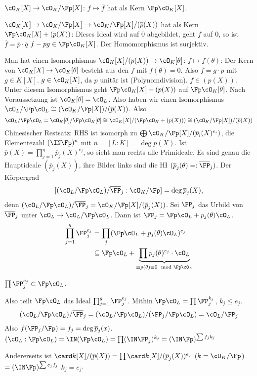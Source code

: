 \begin{Beweis}
 $\cO_K[X]\rightarrow\cO_K/\Fp[X]$: $f\mapsto \overline{f}$ hat als Kern $\Fp\cO_K[X]$.
 
 $\cO_K[X]\rightarrow\cO_K/\Fp[X]\rightarrow \cO_K/\Fp[X]/(\overline{p}(X))$ hat als Kern $\Fp\cO_K[X]+(p(X))$: Dieses Ideal wird auf $0$ abgebildet, geht $f$ auf $0$, so ist $\overline{f}=\overline{p}\cdot\overline{q}$ \folge $f-pg\in\Fp\cO_K[X]$. Der Homomorphismus ist surjektiv.
 
 Man hat einen Isomorphismus $\cO_K[X]/(p(X))\rightarrow \cO_K[\theta]$: $f\mapsto f(\theta)$: Der Kern von $\cO_K[X]\rightarrow\cO_K[\theta]$ besteht aus den $f$ mit $f(\theta)=0$. Also $f=g\cdot p$ mit $g\in K[X]$. \folge $g\in\cO_K[X]$, da $p$ unitär ist (Polynomdivision). \folge $f\in (p(X))$. Unter diesem Isomorphismus geht $\Fp\cO_K[X]+(p(X))$ auf $\Fp\cO_K[\theta]$. Nach Voraussetzung ist $\cO_K[\theta]=\cO_L$. Also haben wir einen Isomorphismus $\cO_L/\Fp\cO_L \cong (\cO_K/\Fp[X])/(\overline{p}(X))$. Also
 \[ \cO_L/\Fp\cO_L = \cO_K[\theta]/\Fp\cO_K[\theta] \cong \cO_K[X]/(\Fp\cO_K+(p(X))) \cong (\cO_K/\Fp[X])/(\overline{p}(X))\]
 Chinesischer Restsatz: RHS ist isomorph zu $\bigoplus \cO_K/\Fp[X]/(\overline{p}_i(X)^{e_i})$, die Elementezahl $(\IN\Fp)^n$ mit $n=[L:K]=\deg p(X)$.  Ist $\overline{p}(X)=\prod_{j=1}^g \overline{p}_j(X)^{e_j}$, so sieht man rechts alle Primideale. Es sind genau die Hauptideale $(\overline p_j(X))$, ihre Bilder links sind die HI $(\overline p_j(\theta)=:\overline\FP_j)$. Der Körpergrad 
 \[ [(\cO_L/\Fp\cO_L)/\overline{\FP}_j:\cO_K/\Fp]=\deg \overline{p}_j(X),\]
 denn $(\cO_L/\Fp\cO_L)/\overline{\FP}_j=\cO_K/\Fp[X]/(\overline{p}_j(X))$. Sei $\FP_j$ das Urbild von $\overline\FP_j$ unter $\cO_L\rightarrow\cO_L/\Fp\cO_L$. Dann ist $\FP_j=\Fp\cO_L+p_j(\theta)\cO_L$.
 \begin{align*}
  \prod_{j=1}^g \FP_j^{e_j}&=\prod_j (\Fp\cO_L+p_j(\theta)\cO_L)^{e_j}\\
  &\subseteq \Fp\cO_L + \underbrace{\prod p_j(\theta)^{e_j}\cdot\cO_L}_{\equiv p(\theta)\equiv 0 \mod{\Fp\cO_L}}
 \end{align*}

 \folge $\prod \FP_j^{e_j}\subset\Fp\cO_L$.
 
 Also teilt $\Fp\cO_L$ das Ideal $\prod_{j=1}^g\FP_j^{e_j}$. Mithin $\Fp\cO_L=\prod \FP_j^{k_j}$, $k_j\leq e_j$.
 \[ (\cO_L/\Fp\cO_L)/\overline\FP_j=(\cO_L/\Fp\cO_L)/(\FP_j/\Fp\cO_L)=\cO_L/\FP_j\]
 Also $f(\FP_j/\Fp)=f_j=\deg\overline{p}_j(x)$.  $(\cO_L:\Fp\cO_L)=\IN(\Fp\cO_L)=\prod (\IN\FP_j)^{k_j}=(\IN\Fp)^{\sum f_jk_j}$
 
 Andererseits ist $\card k[X]/(\overline p(X))=\prod \card k[X]/(\overline p_j(X))^{e_j}$ ($k=\cO_K/\Fp$) $=(\IN\Fp)^{\sum e_jf_j}$ \folge $k_j=e_j$. 
\end{Beweis}

